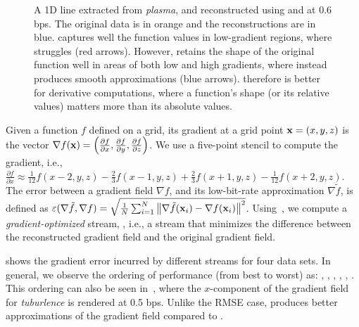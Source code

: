 \begin{figure}[h]
\centering
{} 
\caption{A 1D line extracted from \emph{plasma}, and reconstructed using \sbit and \swav at 0.6 bps.
The original data is in orange and the reconstructions are in blue. \swav captures well the function
values in low-gradient regions, where \sbit struggles (red arrows). However, \sbit retains the shape
of the original function well in areas of both low and high gradients, where \swav instead produces
smooth approximations (blue arrows). \sbit therefore is better for derivative computations, where a
function's shape (or its relative values) matters more than its absolute values.}
\label{fig:bit-plane-vs-wavelet-norm-gradient}
\vspace{-1em}
\end{figure}

Given a function $f$ defined on a grid, its gradient at a grid point \mbox{$\x = (x,y,z)$} is the
vector $\nabla f(\x) = \left(\frac{\partial f}{\partial x}, \frac{\partial f}{\partial y},
\frac{\partial f}{\partial z}\right)$. We use a five-point stencil to compute the gradient, i.e.,
$\frac{\partial f}{\partial x} \approx \frac{1}{12}f(x-2,y,z) - \frac{2}{3}f(x-1,y,z) +
\frac{2}{3}f(x+1,y,z) - \frac{1}{12}f(x+2,y,z)$. The error between a gradient field $\nabla f$, and
its low-bit-rate approximation $\nabla
\tilde{f}$, is defined as $\err(\nabla \tilde{f}, \nabla f) = \sqrt{\frac{1}{N}
\sum_{i=1}^{N}{\norm{\nabla \tilde{f}(\x_i)-\nabla f(\x_i)}^2}}$. Using~, we
compute a \emph{gradient-optimized} stream, \sgop, i.e., a stream that minimizes the difference
between the reconstructed gradient field and the original gradient field.

 shows the gradient error incurred by different streams for four
data sets. In general, we observe the ordering of performance (from best to worst) as: \sgop, \sgsg,
\sbit, \swav, \smag, \slvl. This ordering can also be seen in~,
where the $x$-component of the gradient field for \emph{tuburlence} is rendered at 0.5 bps. Unlike
the RMSE case, \sbit produces better approximations of the gradient field compared to \swav.

